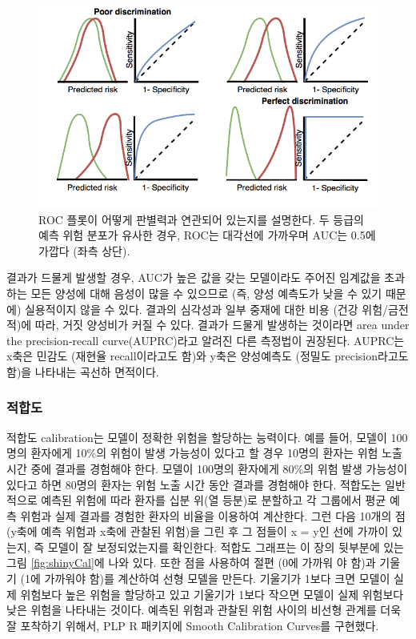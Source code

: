 \documentclass[10.5pt]{book}
\theoremstyle{definition}
\theoremstyle{definition}
\theoremstyle{definition}
\theoremstyle{remark}
\begin{document}
\begin{figure}
\includegraphics[width=1\linewidth]{images/PatientLevelPrediction/theory/roctheory} \caption{ROC 플롯이 어떻게 판별력과 연관되어 있는지를 설명한다. 두 등급의 예측 위험 분포가 유사한 경우, ROC는 대각선에 가까우며 AUC는 0.5에 가깝다 (좌측 상단).}\label{fig:figuretheoryroctheory}
\end{figure}

결과가 드물게 발생할 경우, AUC가 높은 값을 갖는 모델이라도 주어진
임계값을 초과하는 모든 양성에 대해 음성이 많을 수 있으므로 (즉, 양성
예측도가 낮을 수 있기 때문에) 실용적이지 않을 수 있다. 결과의 심각성과
일부 중재에 대한 비용 (건강 위험/금전적)에 따라, 거짓 양성비가 커질 수
있다. 결과가 드물게 발생하는 것이라면 area under the precision-recall
curve(AUPRC)라고 알려진 다른 측정법이 권장된다. AUPRC는 x축은 민감도
(재현율 recall이라고도 함)와 y축은 양성예측도 (정밀도 precision라고도
함)을 나타내는 곡선하 면적이다.

\subsubsection*{적합도}

적합도 calibration는 모델이 정확한 위험을 할당하는 능력이다. 예를 들어,
모델이 100명의 환자에게 10\%의 위험이 발생 가능성이 있다고 할 경우
10명의 환자는 위험 노출 시간 중에 결과를 경험해야 한다. 모델이 100명의
환자에게 80\%의 위험 발생 가능성이 있다고 하면 80명의 환자는 위험 노출
시간 동안 결과를 경험해야 한다. 적합도는 일반적으로 예측된 위험에 따라
환자를 십분 위(열 등분)로 분할하고 각 그룹에서 평균 예측 위험과 실제
결과를 경험한 환자의 비율을 이용하여 계산한다. 그런 다음 10개의 점
(y축에 예측 위험과 x축에 관찰된 위험)을 그린 후 그 점들이 x = y인 선에
가까이 있는지, 즉 모델이 잘 보정되었는지를 확인한다. 적합도 그래프는 이
장의 뒷부분에 있는 그림 \ref{fig:shinyCal}에 나와 있다. 또한 점을
사용하여 절편 (0에 가까워 야 함)과 기울기 (1에 가까워야 함)를 계산하여
선형 모델을 만든다. 기울기가 1보다 크면 모델이 실제 위험보다 높은 위험을
할당하고 있고 기울기가 1보다 작으면 모델이 실제 위험보다 낮은 위험을
나타내는 것이다. 예측된 위험과 관찰된 위험 사이의 비선형 관계를 더욱 잘
포착하기 위해서, PLP R 패키지에 Smooth Calibration Curves를 구현했다.
\end{document}
